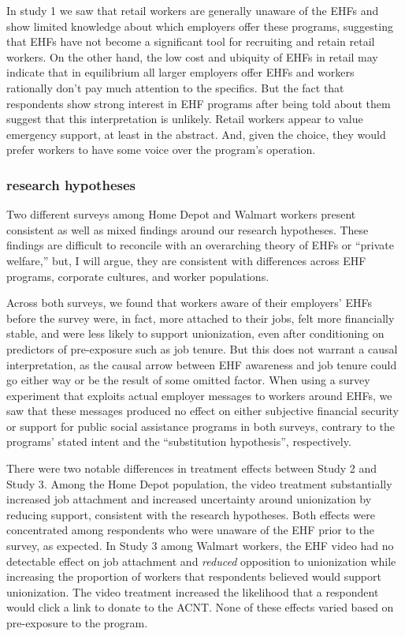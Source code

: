 \documentclass[
  11pt,
  oneside]{article}
\begin{document}
In study 1 we saw that retail workers are generally unaware of the EHFs and show limited knowledge about which employers offer these programs, suggesting that EHFs have not become a significant tool for recruiting and retain retail workers. On the other hand, the low cost and ubiquity of EHFs in retail may indicate that in equilibrium all larger employers offer EHFs and workers rationally don't pay much attention to the specifics. But the fact that respondents show strong interest in EHF programs after being told about them suggest that this interpretation is unlikely. Retail workers appear to value emergency support, at least in the abstract. And, given the choice, they would prefer workers to have some voice over the program's operation.

\subsubsection{research hypotheses}\label{research-hypotheses}

Two different surveys among Home Depot and Walmart workers present consistent as well as mixed findings around our research hypotheses. These findings are difficult to reconcile with an overarching theory of EHFs or ``private welfare,'' but, I will argue, they are consistent with differences across EHF programs, corporate cultures, and worker populations.

Across both surveys, we found that workers aware of their employers' EHFs before the survey were, in fact, more attached to their jobs, felt more financially stable, and were less likely to support unionization, even after conditioning on predictors of pre-exposure such as job tenure. But this does not warrant a causal interpretation, as the causal arrow between EHF awareness and job tenure could go either way or be the result of some omitted factor. When using a survey experiment that exploits actual employer messages to workers around EHFs, we saw that these messages produced no effect on either subjective financial security or support for public social assistance programs in both surveys, contrary to the programs' stated intent and the ``substitution hypothesis'', respectively.

There were two notable differences in treatment effects between Study 2 and Study 3. Among the Home Depot population, the video treatment substantially increased job attachment and increased uncertainty around unionization by reducing support, consistent with the research hypotheses. Both effects were concentrated among respondents who were unaware of the EHF prior to the survey, as expected. In Study 3 among Walmart workers, the EHF video had no detectable effect on job attachment and \emph{reduced} opposition to unionization while increasing the proportion of workers that respondents believed would support unionization. The video treatment increased the likelihood that a respondent would click a link to donate to the ACNT. None of these effects varied based on pre-exposure to the program.
\end{document}
